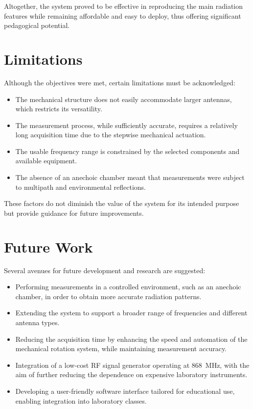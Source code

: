Altogether, the system proved to be effective in reproducing the main radiation features while remaining affordable and easy to deploy, thus offering significant pedagogical potential.

\section{Limitations}

Although the objectives were met, certain limitations must be acknowledged:
\begin{itemize}
    \item The mechanical structure does not easily accommodate larger antennas, which restricts its versatility.
    \item The measurement process, while sufficiently accurate, requires a relatively long acquisition time due to the stepwise mechanical actuation.
    \item The usable frequency range is constrained by the selected components and available equipment.
    \item The absence of an anechoic chamber meant that measurements were subject to multipath and environmental reflections.
\end{itemize}

These factors do not diminish the value of the system for its intended purpose but provide guidance for future improvements.

\section{Future Work}
Several avenues for future development and research are suggested:
\begin{itemize}
    \item Performing measurements in a controlled environment, such as an anechoic chamber, in order to obtain more accurate radiation patterns.
    \item Extending the system to support a broader range of frequencies and different antenna types.
    \item Reducing the acquisition time by enhancing the speed and automation of the mechanical rotation system, while maintaining measurement accuracy.
    \item Integration of a low-cost RF signal generator operating at 868~MHz, with the aim of further reducing the dependence on expensive laboratory instruments.
    \item Developing a user-friendly software interface tailored for educational use, enabling integration into laboratory classes.
\end{itemize}

